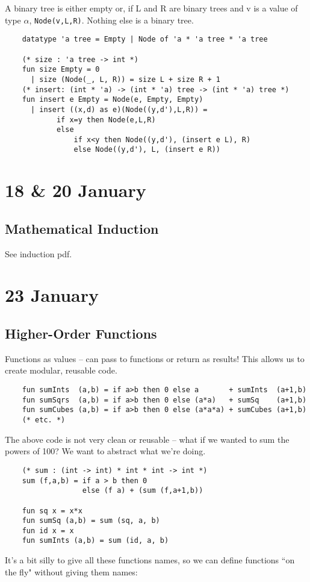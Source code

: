 \documentclass[11pt]{article}
\begin{document}
A binary tree is either empty or, if L and R are binary trees and v is a value of type $\alpha$, \verb!Node(v,L,R)!. Nothing else is a binary tree.

\begin{verbatim}
    datatype 'a tree = Empty | Node of 'a * 'a tree * 'a tree
    
    (* size : 'a tree -> int *)
    fun size Empty = 0
      | size (Node(_, L, R)) = size L + size R + 1
    (* insert: (int * 'a) -> (int * 'a) tree -> (int * 'a) tree *)
    fun insert e Empty = Node(e, Empty, Empty)
      | insert ((x,d) as e)(Node((y,d'),L,R)) =
            if x=y then Node(e,L,R)
            else
                if x<y then Node((y,d'), (insert e L), R)
                else Node((y,d'), L, (insert e R))
\end{verbatim}

\section{18 \& 20 January} %
\subsection{Mathematical Induction}
See induction pdf.

\section{23 January} %
\subsection{Higher-Order Functions}
Functions as values -- can pass to functions or return as results! This allows us to create modular, reusable code.

\begin{verbatim}
    fun sumInts  (a,b) = if a>b then 0 else a       + sumInts  (a+1,b)
    fun sumSqrs  (a,b) = if a>b then 0 else (a*a)   + sumSq    (a+1,b)
    fun sumCubes (a,b) = if a>b then 0 else (a*a*a) + sumCubes (a+1,b)
    (* etc. *)
\end{verbatim}
The above code is not very clean or reusable -- what if we wanted to sum the powers of 100? We want to abstract what we're doing.

\begin{verbatim}
    (* sum : (int -> int) * int * int -> int *)
    sum (f,a,b) = if a > b then 0
                  else (f a) + (sum (f,a+1,b))
    
    fun sq x = x*x
    fun sumSq (a,b) = sum (sq, a, b)
    fun id x = x
    fun sumInts (a,b) = sum (id, a, b)
\end{verbatim}
It's a bit silly to give all these functions names, so we can define functions ``on the fly" without giving them names:
\end{document}
